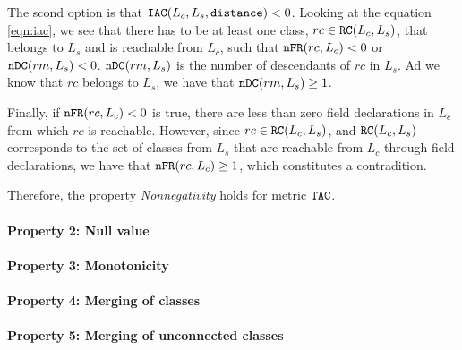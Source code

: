 The scond option is that $\verb|IAC|(L_c,L_s, \verb|distance|) < 0$. Looking at the equation \ref{eqn:iac}, we see that there has to be at least one class, $rc \in \verb|RC|(L_c,L_s)$, that belongs to $L_s$ and is reachable from $L_c$, such that $\verb|nFR|(rc,L_c) < 0$ or $\verb|nDC|(rm, L_s) < 0$. $\verb|nDC|(rm, L_s)$ is the number of descendants of $rc$ in $L_s$. Ad we know that $rc$ belongs to $L_s$, we have that $\verb|nDC|(rm, L_s) \geq 1$.

Finally, if $\verb|nFR|(rc,L_c) < 0$ is true, there are less than zero field declarations in $L_c$ from which $rc$ is reachable. However, since $rc \in \verb|RC|(L_c,L_s)$, and $\verb|RC|(L_c,L_s)$ corresponds to the set of classes from $L_s$ that are reachable from $L_c$ through field declarations, we have that $\verb|nFR|(rc,L_c) \geq 1$, which constitutes a contradition.

Therefore, the property \textit{Nonnegativity} holds for metric $\verb|TAC|$.

\paragraph{Property 2: Null value}

\paragraph{Property 3: Monotonicity}

\paragraph{Property 4: Merging of classes}

\paragraph{Property 5: Merging of unconnected classes}

